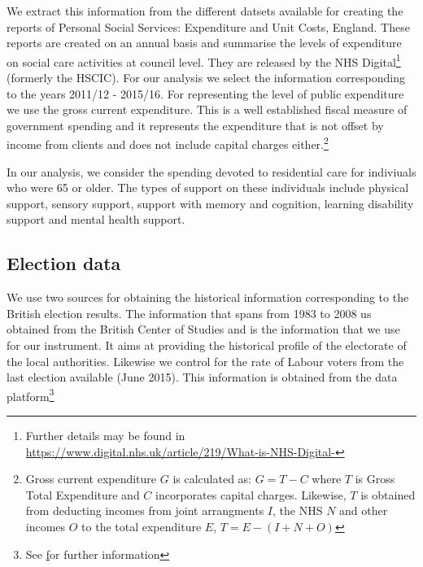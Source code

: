 \documentclass[12pt,letterpaper]{article}
\begin{document}
We extract this information from the different datsets available for creating the reports of Personal Social Services: Expenditure and Unit Costs, England. 
These reports are created on an annual basis and summarise the levels of expenditure on social care activities at council level. 
They are released by the NHS Digital\footnote{Further details may be found in \href{https://www.digital.nhs.uk/article/219/What-is-NHS-Digital-}{https://www.digital.nhs.uk/article/219/What-is-NHS-Digital-}} (formerly the HSCIC). 
For our analysis we select the information corresponding to the years 2011/12 - 2015/16. For representing the level
 of public expenditure we use the gross current expenditure. This is a well established fiscal measure of 
 government spending and it represents the expenditure that is not offset by income from clients and does not include capital charges either.\footnote{Gross current expenditure $G$
  is calculated as: $G = T - C$ where $T$ is Gross Total Expenditure and $C$ incorporates capital charges. 
  Likewise, $T$ is obtained from deducting incomes from joint arrangments $I$, the NHS $N$ and other incomes $O$ to the total expenditure
   $E$, $T = E - (I+N+O)$}

 In our analysis, we consider the spending devoted to residential care for indiviuals who were 65 or older. 
 The types of support on these individuals include physical support, sensory support, support with memory 
 and cognition, learning disability support and mental health support. 
 
 \subsection*{Election data}

We use two sources for obtaining the historical information corresponding
 to the British election results. The information that spans from 1983 to 2008
  us obtained from the British Center of Studies and is the information that we 
  use for our instrument. It aims at providing the historical profile of the electorate
   of the local authorities. Likewise we control for the rate of Labour voters from the last
    election available (June 2015). This information is obtained from the data
     platform\footnote{See \href{http://www.data.parliament.uk/dataset/general-election-2015} for further information}
\end{document}
